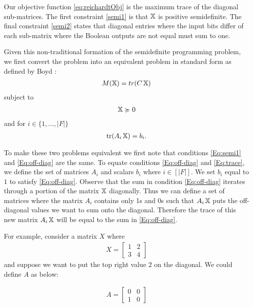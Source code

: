 Our objective function \cref{eq:reichardtObj} is
the maximum trace of the diagonal sub-matrices. The
first constraint \cref{semi1} is that $\operatorname{\mathbb{X}}$ is positive
semidefinite. The final constraint \cref{semi2} states that
diagonal entries where the input bits differ
of each sub-matrix where the Boolean outputs are not equal must sum to one.

Given this non-traditional formation of the semidefinite programming problem, we first convert the problem into an equivalent problem in standard form as defined by Boyd \cite{boyd2004convex}:
\begin{align}\label{Eq:boyd_obj}
    M(\operatorname{\mathbb{X}}) = tr(C\operatorname{\mathbb{X}}) 
\end{align}
subject to
\begin{align}
    \operatorname{\mathbb{X}} \succcurlyeq 0   
\end{align}
and for $i \in \{1,...,|F|\}$
\begin{align}\label{Eq:trace}
    \operatorname{\text{tr}}(A_i \operatorname{\mathbb{X}}) = b_i. 
\end{align}


To make these two problems equivalent we first note that
conditions \cref{Eq:semi1} and \cref{Eq:off-diag} are
the same.
To equate conditions \cref{Eq:off-diag}
and \cref{Eq:trace}, we define the set of matrices
$A_i$ and
scalars $b_i$ where $i \in [|F|]$.
We set $b_i$ equal to $1$ to satisfy \cref{Eq:off-diag}.
Observe that the sum in condition \cref{Eq:off-diag}
iterates through a portion of the matrix $\operatorname{\mathbb{X}}$ diagonally.
Thus we can define a set of matrices where the matrix 
$A_i$ contains only 1s and 0s 
such that $A_i \operatorname{\mathbb{X}}$ puts the off-diagonal values we want
to sum onto the diagonal.
Therefore the trace of this new matrix $A_i \operatorname{\mathbb{X}}$ 
will be equal to the sum in \cref{Eq:off-diag}.

For example, consider a matrix $X$ where
\begin{align}
    X = \left[ \begin{matrix} 1 & 2 \\ 3 & 4 \end{matrix} \right] \nonumber
\end{align}
and suppose we want to put the top right value $2$ on the diagonal.
We could define $A$ as below:

\begin{align}
    A = \left[ \begin{matrix} 0 & 0 \\ 1 & 0 \end{matrix} \right] \nonumber
\end{align}

